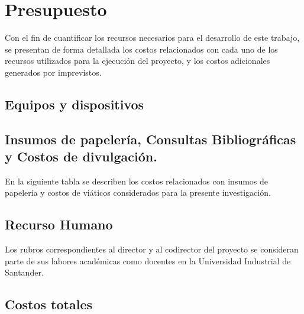 \chapter{Presupuesto}
\label{sec:Presupuesto}

Con el fin de cuantificar los recursos necesarios para el desarrollo de este trabajo, se presentan de forma detallada los costos relacionados con cada uno de los recursos utilizados para la ejecución del proyecto, y los costos adicionales generados por imprevistos.\\

\section{Equipos y dispositivos}



\section{Insumos de papelería, Consultas Bibliográficas y Costos de divulgación.}

En la siguiente tabla se describen los costos relacionados con insumos de papelería y costos de viáticos considerados para la presente investigación.\\



\section{Recurso Humano}



Los rubros correspondientes al director y al codirector del proyecto se consideran parte de sus labores académicas como docentes en la Universidad Industrial de Santander.\\



\section{Costos totales}

